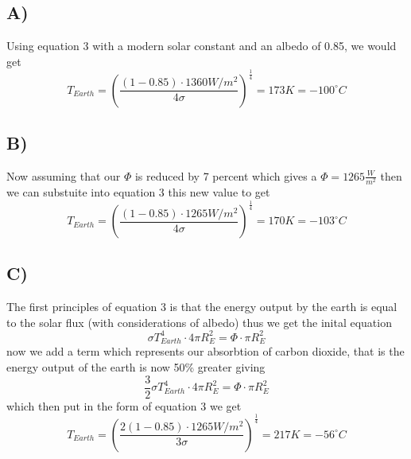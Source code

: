 \documentclass[12pt]{article}
\begin{document}
\subsection*{A)}
Using equation 3 with a modern solar constant and an albedo of 0.85, we would get 
\begin{equation*}
    T_{Earth}=\left(\frac{ \left(1-0.85\right) \cdot 1360W/m^2}{4\sigma}\right)^{\frac{1}{4}} = 173K = -100^{\circ}C
\end{equation*}
\subsection*{B)}
Now assuming that our $\Phi$ is reduced by 7 percent which gives a $\Phi = 1265 \frac{W}{m^2}$ then we can substuite into equation 3 this new value to get 
\begin{equation*}
        T_{Earth}=\left(\frac{ \left(1-0.85\right) \cdot 1265W/m^2}{4\sigma}\right)^{\frac{1}{4}} = 170K = -103^{\circ}C
\end{equation*}
\subsection*{C)}
The first principles of equation 3 is that the energy output by the earth is equal to the solar flux (with considerations of albedo)
thus we get the inital equation
\begin{equation}
    \sigma T_{Earth}^4 \cdot 4 \pi R_E^2 = \Phi \cdot \pi R_E^2
\end{equation}
now we add a term which represents our absorbtion of carbon dioxide, that is the energy output of the earth is now 50\% greater giving
\begin{equation*}
    \frac{3}{2} \sigma T_{Earth}^4 \cdot 4 \pi R_E^2 = \Phi \cdot \pi R_E^2
\end{equation*}
which then put in the form of equation 3 we get
\begin{equation}
    T_{Earth}=\left(\frac{2 \left(1-0.85\right) \cdot 1265W/m^2}{3\sigma}\right)^{\frac{1}{4}} =217K = -56^{\circ}C
\end{equation}
\end{document}

